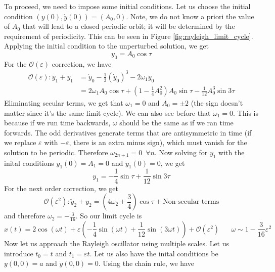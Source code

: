 \documentclass{article}
\newcommand{\twen}{\hspace{20pt}}
\begin{document}
To proceed, we need to impose some initial conditions. Let us choose the initial condition $(y(0), \dot{y}(0)) = (A_0, 0)$. Note, we do not know a priori the value of $A_0$ that will lead to a closed periodic orbit; it will be determined by the requirement of periodicity. This can be seen in Figure \ref{fig:rayleigh_limit_cycle}. Applying the initial condition to the unperturbed solution, we get 
\begin{equation*}
    y_0 = A_0\cos \tau
\end{equation*}
For the $\mathcal{O}(\varepsilon)$ correction, we have
\begin{align*}
    \mathcal{O}(\varepsilon): \ddot y_1 + y_1 &= \dot y_0 - \frac{1}{3}(\dot y_0)^3-2\omega _1 \ddot y_0 \\
    &= 2\omega_1 A_0 \cos \tau + \left(1-\frac{1}{4}A_0^2\right) A_0 \sin \tau - \frac{1}{12}A_0^3 \sin 3\tau
\end{align*}
Eliminating secular terms, we get that $\omega_1 =0$ and $A_0 = \pm2$ (the sign doesn't matter since it's the same limit cycle). We can also see before that $\omega_1=0$. This is because if we run time backwards, $\omega$ should be the same as if we ran time forwards. The odd derivatives generate terms that are antisymmetric in time (if we replace $\varepsilon $ with $-\varepsilon$, there is an extra minus sign), which must vanish for the solution to be periodic. Therefore $\omega_{2n+1}=0\,\,\, \forall n$. Now solving for $y_1$ with the inital conditions $y_1(0)=A_1=0$ and $\dot y_1(0)=0$, we get
\begin{equation*}
    y_1 = -\frac{1}{4} \sin \tau + \frac{1}{12} \sin 3\tau
\end{equation*}
For the next order correction, we get 
\begin{equation*}
    \mathcal{O}(\varepsilon^2): \ddot y_2 + y_2 = \left(4\omega_2 + \frac{3}{4}\right)\cos \tau + \text{Non-secular terms}
\end{equation*}
and therefore $\omega_2 = -\frac{3}{16}$. So our limit cycle is 
\begin{equation*}
    x(t) = 2\cos (\omega t)+\varepsilon\left(-\frac{1}{4} \sin (\omega t) + \frac{1}{12} \sin (3\omega t)\right) + \mathcal{O}(\varepsilon^2) \twen \omega \sim 1 -\frac{3}{16}\varepsilon^2
\end{equation*}
Now let us approach the Rayleigh oscillator using multiple scales. Let us introduce $t_0=t$ and $t_1 =\varepsilon t$. Let us also have the inital conditions be $y(0,0) = a$ and $\dot y(0,0) = 0$. Using the chain rule, we have 
\end{document}
